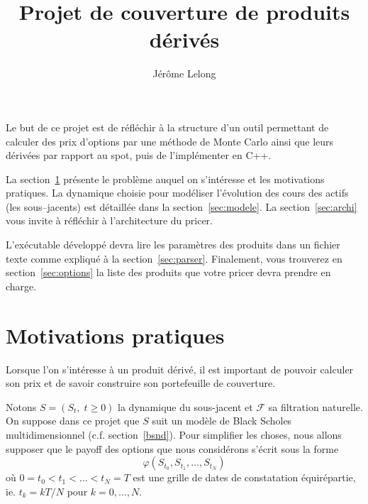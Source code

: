 \documentclass[a4paper,11pt]{article}
\title{Projet de couverture de produits dérivés}
\author{Jérôme Lelong}
\def\cf{{\mathcal F}}
\begin{document}
\maketitle

Le but de ce projet  est de réfléchir à la structure d'un outil permettant de calculer des prix d'options par une méthode de Monte Carlo ainsi que leurs dérivées par rapport au spot, puis de l'implémenter en C++.

La section~\ref{sec:motiv} présente le problème auquel on s'intéresse et les motivations pratiques. La dynamique choisie pour modéliser l'évolution des cours des actifs (les sous--jacents) est détaillée dans la section~\ref{sec:modele}.  La section~\ref{sec:archi} vous invite à réfléchir à l'architecture du pricer.

L'exécutable développé devra lire les paramètres des produits dans un fichier texte comme expliqué à la section~\ref{sec:parser}. Finalement, vous trouverez en section~\ref{sec:options} la liste des produits que votre pricer devra prendre en charge.

\section{Motivations pratiques}
\label{sec:motiv}

Lorsque l'on s'intéresse à un produit dérivé, il est important de pouvoir
calculer son prix et de savoir construire son portefeuille de couverture.

Notons $S = (S_t, \; t \ge 0)$ la dynamique du sous-jacent et $\cf$ sa filtration naturelle. On suppose dans ce projet que $S$ suit un modèle de Black Scholes multidimensionnel (c.f.  section~\ref{bsnd}).  Pour simplifier les choses, nous allons supposer que le payoff des options que nous considérons s'écrit sous la forme
\begin{equation*}
 \varphi(S_{t_0}, S_{t_1}, \dots, S_{t_N})
\end{equation*}
où $0 = t_0 < t_1 < \dots < t_N = T$ est une grille de dates de constatation équirépartie, ie. $t_k = kT / N$ pour $k=0,\dots, N$.
\end{document}
